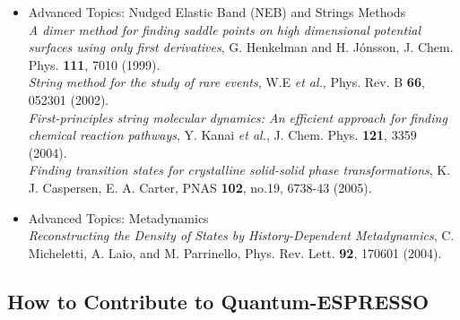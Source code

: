 \documentclass[12pt,a4paper]{article}
\begin{document}
\begin{itemize}
\item Advanced Topics: Nudged Elastic Band (NEB) and Strings Methods
\medskip \\
  \emph{A dimer method for finding saddle points on high dimensional 
    potential surfaces using only first derivatives}, G. Henkelman and 
    H. J{\'o}nsson, J. Chem. Phys. \textbf{111}, 7010 (1999).\\
  \emph{String method for the study of rare events}, W.E \emph{et al.},
  Phys. Rev. B \textbf{66}, 052301 (2002).\\
  \emph{First-principles string molecular dynamics: An efficient approach
    for finding chemical reaction pathways}, Y. Kanai \emph{et al.},
  J. Chem. Phys. \textbf{121}, 3359 (2004).\\
  {\em Finding transition states for crystalline solid-solid phase 
    transformations}, K. J. Caspersen, E. A. Carter, 
  PNAS \textbf{102}, no.19, 6738-43 (2005).
\item Advanced Topics: Metadynamics
\medskip \\
  \emph{Reconstructing the Density of States by History-Dependent 
  Metadynamics}, C. Micheletti, A. Laio, and M. Parrinello,
  Phys. Rev. Lett. \textbf{92}, 170601 (2004).
\end{itemize}

\subsection{How to Contribute to Quantum-ESPRESSO}
\end{document}

